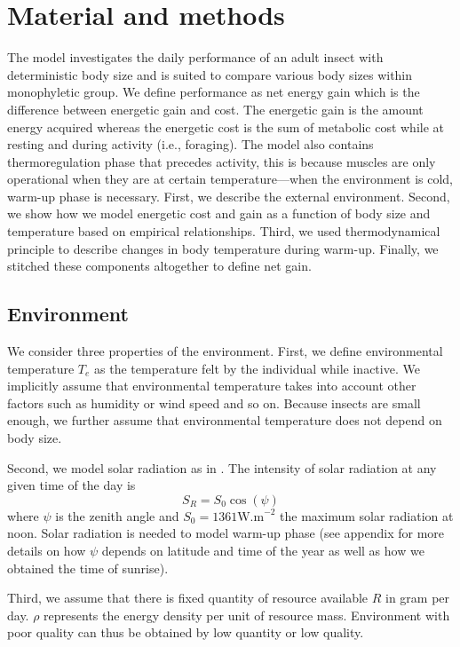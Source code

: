 \section*{Material and methods}
The model investigates the daily performance of an adult insect with deterministic body size and is suited to compare various body sizes within monophyletic group.
We define performance as net energy gain which is the difference between energetic gain and cost.
The energetic gain is the amount energy acquired whereas  the energetic cost is the sum of metabolic cost while at resting and during activity (i.e., foraging).
The model also contains thermoregulation phase that precedes activity, this is because muscles are only operational when they are at certain temperature---when the environment is cold, warm-up phase is necessary. 
First, we describe the external environment.
Second, we show how we model energetic cost and gain as a function of body size and temperature based on empirical relationships.
Third, we used thermodynamical principle to describe changes in body temperature during warm-up.
Finally, we stitched these components altogether to define net gain. 

\subsection*{Environment}
We consider three properties of the environment. 
First, we define environmental temperature $T_e$ as the temperature felt by the individual while inactive.
We implicitly assume that environmental temperature takes into account other factors such as humidity or wind speed and so on.
Because insects are small enough, we further assume that environmental temperature does not depend on body size.

Second, we model solar radiation as in \citet{Campbell2012}.
The intensity of solar radiation at any given time of the day is \[S_R = S_0 \cos(\psi) \]
where $\psi$ is the zenith angle and $S_0 = 1361 \mbox{W.m}^{-2}$ the maximum solar radiation at noon.
Solar radiation is needed to model warm-up phase (see appendix for more details on how $\psi$ depends on latitude and time of the year as well as how we obtained the time of sunrise).

Third, we assume that there is fixed quantity of resource available $R$ in gram per day.
$\rho$ represents the energy density per unit of resource mass. %
Environment with poor quality can thus be obtained by low quantity or low quality.

